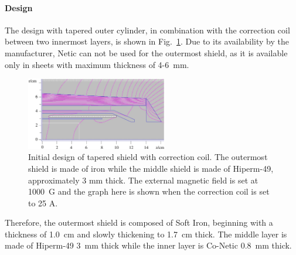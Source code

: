 \documentclass[12pt]{article}
\begin{document}
\paragraph{Design}
The design with tapered outer cylinder, in combination with the correction coil between
two innermost layers, is shown in  Fig.~\ref{Tapered_Shield_Design}.
Due to its availability by the manufacturer, Netic can not be used  for the outermost shield, as it 
is available only in sheets with maximum thickness of 4-6~mm. 
%
\begin{figure}[htbp]
\centering
\includegraphics[width=0.55\textwidth]{R2083_Iron_hiperm49_CONETIC_TaperedShieldDesign.eps}
\caption{\small{Initial design of tapered shield with correction coil. 
The outermost shield is made of iron while the middle shield is made 
of Hiperm-49, approximately 3 mm thick. The external magnetic field is set at 1000~G and the
graph here is shown when the correction coil is set to 25 A.}}
\label{Tapered_Shield_Design}
\end{figure}
%
Therefore, the outermost  shield is composed of Soft Iron, beginning with a thickness of 1.0~cm and 
slowly thickening to 1.7~cm thick. 
The middle layer is made of Hiperm-49 3~mm thick while  the inner layer is Co-Netic 
0.8~mm thick.
\end{document}
